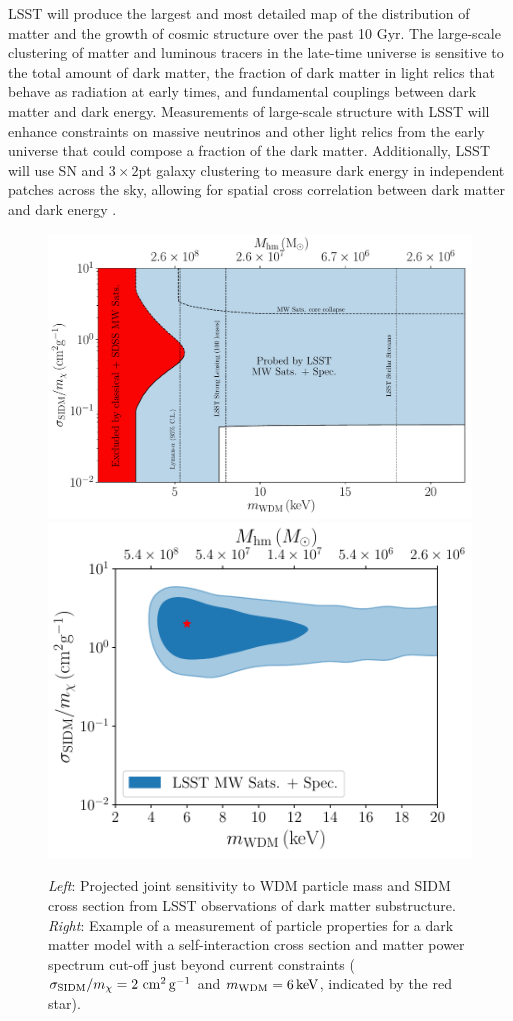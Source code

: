 \documentclass[12pt]{article}
\begin{document}
 LSST will produce the largest and most detailed map of the distribution of matter and the growth of cosmic structure over the past 10 Gyr.
The large-scale clustering of matter and luminous tracers in the late-time universe is sensitive to the total amount of dark matter, the fraction of dark matter in light relics that behave as radiation at early times, and fundamental couplings between dark matter and dark energy.
Measurements of large-scale structure with LSST will enhance constraints on massive neutrinos and other light relics from the early universe that could compose a fraction of the dark matter.
Additionally, LSST will use SN and $3\times2$pt galaxy clustering to  measure dark energy in independent patches across the sky, allowing for spatial cross correlation between dark matter and dark energy \citep{0902.2590}.

\begin{figure}[t]
\centering
\includegraphics[width=0.53\columnwidth]{figures/SIDM_WDM_figw_coll.pdf}
\includegraphics[width=0.46\columnwidth]{figures/WDM_SIDM_discovery_test.pdf}
\caption{\emph{Left}: Projected joint sensitivity to WDM particle mass and SIDM cross section from LSST observations of dark matter substructure. 
\emph{Right}: Example of a measurement of particle properties for a dark matter model with a self-interaction cross section and matter power spectrum cut-off just beyond current constraints ($\sigma_{\rm SIDM}/m_\chi = 2 \mathrm{\,\mathrm{\,cm}^2\mathrm{\,g}^{-1}}$ and $m_{\rm WDM} = 6\mathrm{\,keV}$, indicated by the red star).}
\end{figure}
\end{document}
